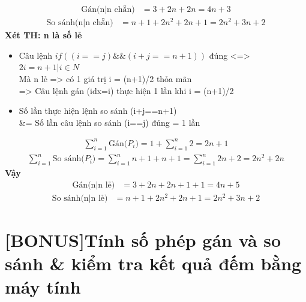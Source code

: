 \documentclass[10pt,a4paper]{article}
\begin{document}
    \begin{align*}
        \text{Gán(n|n chẵn)} 
          & = 3 + 2n + 2n = 4n + 3
    \end{align*}
    \begin{align*}
        \text{So sánh(n|n chẵn)}
            & = n+1+2n^2+2n+1 = 2n^2+3n+2
    \end{align*}
    \textbf{Xét TH: n là số lẻ} \\
    \begin{itemize}
        \item Câu lệnh $if((i==j)\&\&(i+j==n+1))$ đúng <=> $2i = n+1 | i\in N$ 
        \\ Mà n lẻ => có 1 giá trị i = (n+1)/2 thỏa mãn
        \\ => Câu lệnh gán (idx=i) thực hiện 1 lần khi i = (n+1)/2
        \item Số lần thực hiện lệnh so sánh (i+j==n+1) \\&= Số lần câu lệnh so sánh (i==j) đúng = 1 lần
    \end{itemize}
    \begin{align*}
         \sum_{i=1}^{n}{\text{Gán($P_i$)}}
         = 1+ \sum_{i=1}^{n}{2} = 2n + 1
    \end{align*}
    \begin{align*}
        \sum_{i=1}^{n}{\text{So sánh($P_i$)}} = 
        \sum_{i=1}^{n}{n+1+n + 1} = \sum_{i=1}^{n}{2n+2} = 2n^2+2n
    \end{align*}
    \textbf{Vậy}
    \begin{align*}
        \text{Gán(n|n lẻ)} 
          & = 3 + 2n + 2n + 1 +1 =4n+5
    \end{align*}
    \begin{align*}
        \text{So sánh(n|n lẻ)}
            & = n+1 + 2n^2+2n + 1 = 2n^2 + 3n+2
    \end{align*}
\section{[BONUS]Tính số phép gán và so sánh \& kiểm tra kết quả đếm bằng máy tính}
\end{document}

